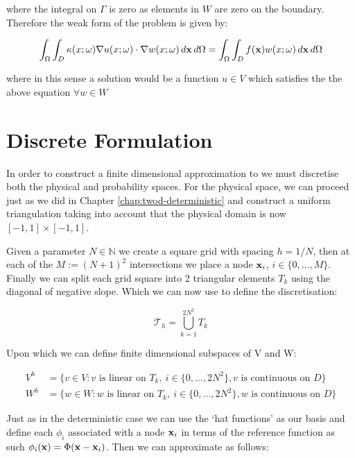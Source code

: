 where the integral on $\Gamma$ is zero as elements in $W$ are zero on the
boundary. Therefore the weak form of the problem is given by:

\begin{equation}\label{eq:twod-stochastic-wk}
    \int_{\Omega}\int_D\kappa(x;\omega)\nabla u(x;\omega)\cdot\nabla
    w(x;\omega)\, d\mathbf{x}\, d\Omega =
    \int_{\Omega}\int_D f(\mathbf{x})w(x;\omega)\, d\mathbf{x}\, d\Omega
\end{equation}

where in this sense a solution would be a function $u \in V$ which satisfies
the the above equation $\forall w \in W$

\section{Discrete Formulation}

In order to construct a finite dimensional approximation to
 we must discretise both the physical and probability
spaces. For the physical space, we can proceed just as we did in Chapter
\ref{chap:twod-deterministic} and construct a uniform triangulation taking
into account that the physical domain is now $[-1,1] \times [-1,1]$.

Given a parameter $N \in \mathbb{N}$ we create a
square grid with spacing $h = 1/N$, then at each of the $M := (N+1)^2$
intersections we place a node $\mathbf{x}_i$, $i \in \{0,\ldots, M\}$. Finally we
can split each grid square into 2 triangular elements $T_k$ using the diagonal
of negative slope. Which we can now use to define the discretisation:

\[
    \mathcal{T}_h = \bigcup_{k=1}^{2N^2}T_k
\]

Upon which we can define finite dimensional subspaces of V and W:

\begin{align*}
    V^h &= \{v \in V: v \text{ is linear on } T_k,\ i \in \{0, \ldots, 2N^2\},
                      v \text{ is continuous on } D\} \\
    W^h &= \{w \in W: w \text{ is linear on } T_k,\ i \in \{0, \ldots, 2N^2\},
                      w \text{ is continuous on } D\}
\end{align*}

Just as in the deterministic case we can use the `hat functions' as our basis
and define each $\phi_i$ associated with a node $\mathbf{x}_i$ in terms of the
reference function  as such
$\phi_i(\mathbf{x}) = \Phi(\mathbf{x} - \mathbf{x}_i)$. Then we can approximate as follows:

